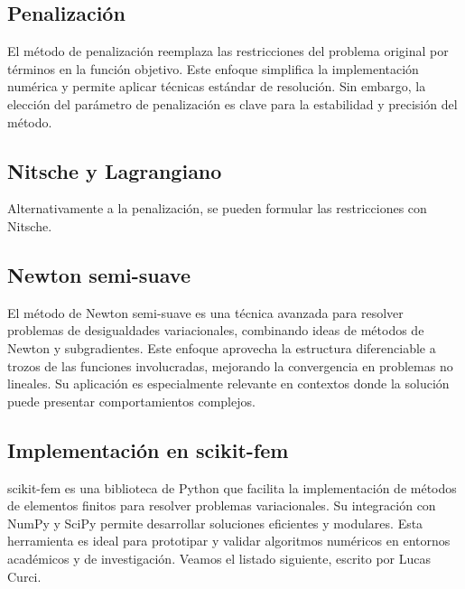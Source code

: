 \documentclass[12pt]{book}
\theoremstyle{definition}
\theoremstyle{plain}
\theoremstyle{remark}
\begin{document}
\subsection{Penalización}
El método de penalización reemplaza las restricciones del problema original por términos en la función objetivo. Este enfoque simplifica la implementación numérica y permite aplicar técnicas estándar de resolución. Sin embargo, la elección del parámetro de penalización es clave para la estabilidad y precisión del método.

\subsection{Nitsche y Lagrangiano}

Alternativamente a la penalizaci\'on, se pueden formular las restricciones con Nitsche.

\subsection{Newton semi-suave}
El método de Newton semi-suave es una técnica avanzada para resolver problemas de desigualdades variacionales, combinando ideas de métodos de Newton y subgradientes. Este enfoque aprovecha la estructura diferenciable a trozos de las funciones involucradas, mejorando la convergencia en problemas no lineales. Su aplicación es especialmente relevante en contextos donde la solución puede presentar comportamientos complejos.

\subsection{Implementación en scikit-fem}
scikit-fem es una biblioteca de Python que facilita la implementación de métodos de elementos finitos para resolver problemas variacionales. Su integración con NumPy y SciPy permite desarrollar soluciones eficientes y modulares. Esta herramienta es ideal para prototipar y validar algoritmos numéricos en entornos académicos y de investigación. Veamos el listado siguiente, escrito por Lucas Curci.
\end{document}

